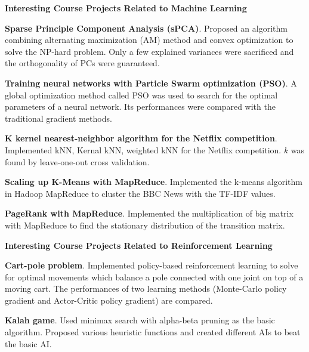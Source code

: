 \documentclass[margin,line,11pt]{resume}
\begin{document}
\begin{resume}
\textbf{Interesting Course Projects Related to Machine Learning}
\vspace{0.5 em}
\begin{list2}
\item \textbf{Sparse Principle Component Analysis (sPCA)}. Proposed an algorithm combining alternating maximization (AM) method and convex optimization to solve the NP-hard problem. Only a few explained variances were sacrificed and the orthogonality of PCs were guaranteed. 
\item \textbf{Training neural networks with Particle Swarm optimization (PSO)}. A global optimization method called PSO was used to search for the optimal parameters of a neural network.  Its performances were compared with the traditional gradient methods.
\item \textbf{K kernel nearest-neighbor algorithm for the Netflix competition}. Implemented kNN, Kernal kNN, weighted kNN for the Netflix competition. $k$ was found by leave-one-out cross validation. 
\item \textbf{Scaling up K-Means with MapReduce}. Implemented the k-means algorithm in Hadoop MapReduce to cluster the BBC News with the TF-IDF values.
\item \textbf{PageRank with MapReduce}. Implemented the multiplication of big matrix with MapReduce to find the stationary distribution of the transition  matrix. 
\end{list2}


\textbf{Interesting Course Projects Related to Reinforcement Learning}
\vspace{0.5 em}
\begin{list2}        
\item \textbf{Cart-pole problem}. Implemented policy-based reinforcement learning  to solve for optimal movements which balance a pole connected with one joint on top of a moving cart. The performances of two learning methods (Monte-Carlo policy gradient and Actor-Critic policy gradient) are compared. 
\item \textbf{Kalah game}. Used minimax search with alpha-beta pruning as the basic algorithm. Proposed various heuristic functions and created different AIs to beat the basic AI. 
\end{list2}




\end{resume}
\end{document}
